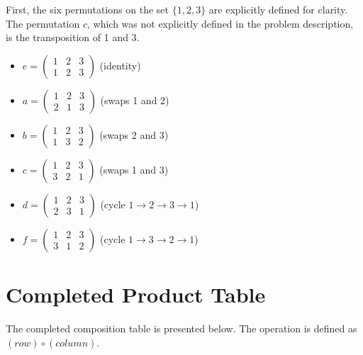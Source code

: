 \documentclass[10pt]{article}
\theoremstyle{definition}
\theoremstyle{plain}
\numberwithin{equation}{section}
\begin{document}
\newpage


First, the six permutations on the set $\{1, 2, 3\}$ are explicitly defined for clarity. The permutation $c$, which was not explicitly defined in the problem description, is the transposition of 1 and 3.

\begin{itemize}
  \item $e = \begin{pmatrix} 1 & 2 & 3 \\ 1 & 2 & 3 \end{pmatrix}$ (identity)
  \item $a = \begin{pmatrix} 1 & 2 & 3 \\ 2 & 1 & 3 \end{pmatrix}$ (swaps 1 and 2)
  \item $b = \begin{pmatrix} 1 & 2 & 3 \\ 1 & 3 & 2 \end{pmatrix}$ (swaps 2 and 3)
  \item $c = \begin{pmatrix} 1 & 2 & 3 \\ 3 & 2 & 1 \end{pmatrix}$ (swaps 1 and 3)
  \item $d = \begin{pmatrix} 1 & 2 & 3 \\ 2 & 3 & 1 \end{pmatrix}$ (cycle $1 \to 2 \to 3 \to 1$)
  \item $f = \begin{pmatrix} 1 & 2 & 3 \\ 3 & 1 & 2 \end{pmatrix}$ (cycle $1 \to 3 \to 2 \to 1$)
\end{itemize}

\section*{Completed Product Table}
The completed composition table is presented below. The operation is defined as $(row) \circ (column)$.
\end{document}
